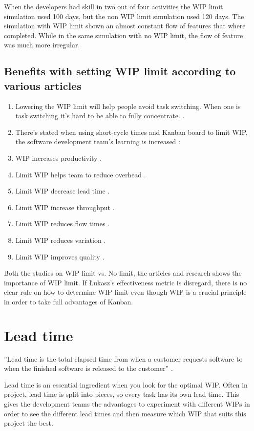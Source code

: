 \documentclass[UKenglish]{ifimaster}  %
\begin{document}
When the developers had skill in two out of four activities the WIP limit simulation used 100 days, but the non WIP limit simulation used 120 days. The simulation with WIP limit shown an almost constant flow of features that where completed. While in the same simulation with no WIP limit, the flow of feature was much more irregular.  
\parencite{DavidAnderson}

\subsection{Benefits with setting WIP limit according to various articles}
\label{sub:sub:benefits}
\begin{enumerate}
\item Lowering the WIP limit will help people avoid task switching. When one is task switching it's hard to be able to fully concentrate. \parencite{Ikonen}.
\item There's stated when using short-cycle times and Kanban board to limit WIP, the software development team's learning is increased \parencite{Joyce}:
\item WIP increases productivity \parencite{Joyce}.
\item Limit WIP helps team to reduce overhead \parencite {CONWIP}.
\item Limit WIP decrease lead time \parencite {CONWIP}.
\item Limit WIP increase throughput \parencite {CONWIP}.
\item Limit WIP reduces flow times \parencite {CONWIP}.
\item Limit WIP reduces variation \parencite {CONWIP}.
\item Limit WIP improves quality \parencite {CONWIP}.
\end{enumerate}

Both the studies on WIP limit vs. No limit, the articles and research shows the importance of WIP limit. If  \L ukasz's effectiveness metric is disregard, there is no clear rule on how to determine WIP limit even though WIP is a crucial principle in order to take full advantages of Kanban.

\section {Lead time}
''Lead time is the total elapsed time from when a customer requests software to when the finished software is released to the customer'' \parencite{Joyce}.

Lead time is an essential ingredient when you look for the optimal WIP. Often in project, lead time is split into pieces, so every task has its own lead time. This gives the development teams the advantages to experiment with different WIPs in order to see the different lead times and then measure which WIP that suits this project the best. 
\end{document}
